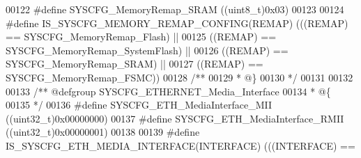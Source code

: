 \begin{DoxyCode}
00122 \textcolor{preprocessor}{#}\textcolor{preprocessor}{define} \textcolor{preprocessor}{SYSCFG\_MemoryRemap\_SRAM}        \textcolor{preprocessor}{(}\textcolor{preprocessor}{(}\textcolor{preprocessor}{uint8\_t}\textcolor{preprocessor}{)}0x03\textcolor{preprocessor}{)}
00123 
00124 \textcolor{preprocessor}{#}\textcolor{preprocessor}{define} \textcolor{preprocessor}{IS\_SYSCFG\_MEMORY\_REMAP\_CONFING}\textcolor{preprocessor}{(}\textcolor{preprocessor}{REMAP}\textcolor{preprocessor}{)} \textcolor{preprocessor}{(}\textcolor{preprocessor}{(}\textcolor{preprocessor}{(}\textcolor{preprocessor}{REMAP}\textcolor{preprocessor}{)} \textcolor{preprocessor}{==} 
      SYSCFG_MemoryRemap_Flash\textcolor{preprocessor}{)} \textcolor{preprocessor}{||}
00125                                                      \textcolor{preprocessor}{(}\textcolor{preprocessor}{(}\textcolor{preprocessor}{REMAP}\textcolor{preprocessor}{)} \textcolor{preprocessor}{==} 
      SYSCFG_MemoryRemap_SystemFlash\textcolor{preprocessor}{)} \textcolor{preprocessor}{||}
00126                                                      \textcolor{preprocessor}{(}\textcolor{preprocessor}{(}\textcolor{preprocessor}{REMAP}\textcolor{preprocessor}{)} \textcolor{preprocessor}{==} 
      SYSCFG_MemoryRemap_SRAM\textcolor{preprocessor}{)} \textcolor{preprocessor}{||}
00127                                                      \textcolor{preprocessor}{(}\textcolor{preprocessor}{(}\textcolor{preprocessor}{REMAP}\textcolor{preprocessor}{)} \textcolor{preprocessor}{==} 
      SYSCFG_MemoryRemap_FSMC\textcolor{preprocessor}{)}\textcolor{preprocessor}{)}
00128 \textcolor{comment}{/**}
00129 \textcolor{comment}{  * @\}}
00130 \textcolor{comment}{  */}
00131 
00132 
00133 \textcolor{comment}{/** @defgroup SYSCFG\_ETHERNET\_Media\_Interface }
00134 \textcolor{comment}{  * @\{}
00135 \textcolor{comment}{  */}
00136 \textcolor{preprocessor}{#}\textcolor{preprocessor}{define} \textcolor{preprocessor}{SYSCFG\_ETH\_MediaInterface\_MII}    \textcolor{preprocessor}{(}\textcolor{preprocessor}{(}\textcolor{preprocessor}{uint32\_t}\textcolor{preprocessor}{)}0x00000000\textcolor{preprocessor}{)}
00137 \textcolor{preprocessor}{#}\textcolor{preprocessor}{define} \textcolor{preprocessor}{SYSCFG\_ETH\_MediaInterface\_RMII}   \textcolor{preprocessor}{(}\textcolor{preprocessor}{(}\textcolor{preprocessor}{uint32\_t}\textcolor{preprocessor}{)}0x00000001\textcolor{preprocessor}{)}
00138 
00139 \textcolor{preprocessor}{#}\textcolor{preprocessor}{define} \textcolor{preprocessor}{IS\_SYSCFG\_ETH\_MEDIA\_INTERFACE}\textcolor{preprocessor}{(}\textcolor{preprocessor}{INTERFACE}\textcolor{preprocessor}{)} \textcolor{preprocessor}{(}\textcolor{preprocessor}{(}\textcolor{preprocessor}{(}\textcolor{preprocessor}{INTERFACE}\textcolor{preprocessor}{)} \textcolor{preprocessor}{==} 

\end{DoxyCode}
